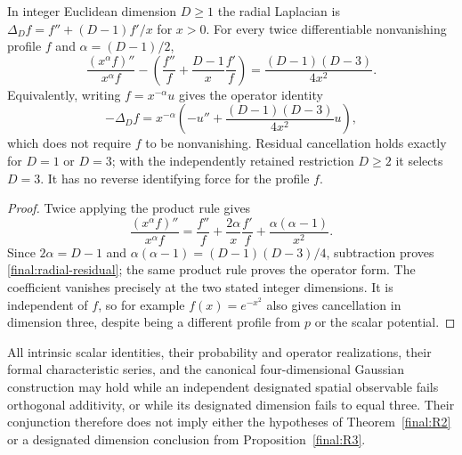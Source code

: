 \begin{proposition}
\label{final:R3}
In integer Euclidean dimension $D\geq1$ the radial Laplacian is
$\Delta_D f=f''+(D-1)f'/x$ for $x>0$.  For every twice differentiable
nonvanishing profile $f$ and $\alpha=(D-1)/2$,
\begin{equation}\label{final:radial-residual}
 \frac{(x^\alpha f)''}{x^\alpha f}
    -\left(\frac{f''}{f}+\frac{D-1}{x}\frac{f'}{f}\right)
     =\frac{(D-1)(D-3)}{4x^2}.
\end{equation}
Equivalently, writing $f=x^{-\alpha}u$ gives the operator identity
\[
 -\Delta_D f=x^{-\alpha}
   \left(-u''+\frac{(D-1)(D-3)}{4x^2}u\right),
\]
which does not require $f$ to be nonvanishing.  Residual cancellation
holds exactly for $D=1$ or $D=3$; with the independently retained
restriction $D\geq2$ it selects $D=3$.  It has no reverse identifying
force for the profile $f$.
\end{proposition}

\begin{proof}
Twice applying the product rule gives
\[
 \frac{(x^\alpha f)''}{x^\alpha f}
 =\frac{f''}{f}+\frac{2\alpha}{x}\frac{f'}{f}
                           +\frac{\alpha(\alpha-1)}{x^2}.
\]
Since $2\alpha=D-1$ and
$\alpha(\alpha-1)=(D-1)(D-3)/4$, subtraction proves
\eqref{final:radial-residual}; the same product rule proves the
operator form.  The coefficient vanishes precisely at the two stated
integer dimensions.  It is independent of $f$, so for example
$f(x)=e^{-x^2}$ also gives cancellation in dimension three, despite
being a different profile from $p$ or the scalar potential.
\end{proof}

\begin{proposition}
\label{final:R4}
All intrinsic scalar identities, their probability and operator
realizations, their formal characteristic series, and the canonical
four-dimensional Gaussian construction may hold while an independent
designated spatial observable fails orthogonal additivity, or while
its designated dimension fails to equal three.  Their conjunction therefore
does not imply either the hypotheses of Theorem~\ref{final:R2} or a
designated dimension conclusion from Proposition~\ref{final:R3}.
\end{proposition}

